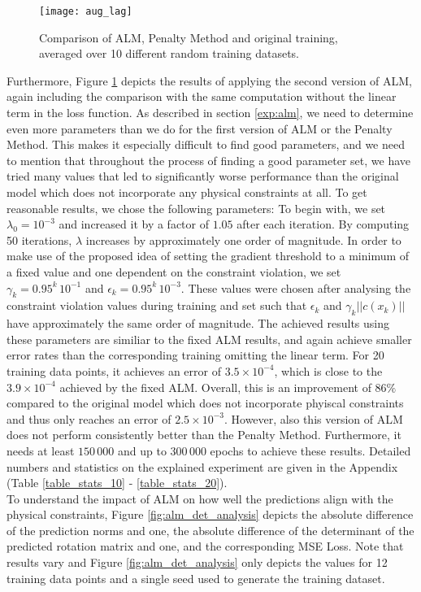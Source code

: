 \begin{figure}[H]
	\texttt{[image: aug\_lag]}
	\caption{Comparison of ALM, Penalty Method and original training, averaged over 10 different random training datasets.}
	\label{fig:aug_lag}
\end{figure}
Furthermore, Figure \ref{fig:aug_lag} depicts the results of applying the second version of ALM, again including the comparison with the same computation without the linear term in the loss function. As described in section \ref{exp:alm}, we need to determine even more parameters than we do for the first version of ALM or the Penalty Method. This makes it especially difficult to find good parameters, and we need to mention that throughout the process of finding a good parameter set, we have tried many values that led to significantly worse performance than the original model which does not incorporate any physical constraints at all. To get reasonable results, we chose the following parameters: To begin with, we set $\lambda_{0} = 10^{-3}$ and increased it by a factor of $1.05$ after each iteration. By computing 50 iterations, $\lambda$ increases by approximately one order of magnitude. In order to make use of the proposed idea of setting the gradient threshold to a minimum of a fixed value and one dependent on the constraint violation, we set $\gamma_k = 0.95^k\,10^{-1}$ and $\epsilon_k = 0.95^k\,10^{-3}$. These values were chosen after analysing the constraint violation values during training and set such that $\epsilon_k$ and $\gamma_k ||c(x_k)||$ have approximately the same order of magnitude. The achieved results using these parameters are similiar to the fixed ALM results, and again achieve smaller error rates than the corresponding training omitting the linear term. For 20 training data points, it achieves an error of $3.5\times 10^{-4}$, which is close to the $3.9 \times 10^{-4}$ achieved by the fixed ALM. Overall, this is an improvement of $86\%$ compared to the original model which does not incorporate phyiscal constraints and thus only reaches an error of $2.5\times 10^{-3}$. However, also this version of ALM does not perform consistently better than the Penalty Method. Furthermore, it needs at least $150\,000$ and up to $300\,000$ epochs to achieve these results. Detailed numbers and statistics on the explained experiment are given in the Appendix (Table \ref{table_stats_10} - \ref{table_stats_20}).\\
\indent To understand the impact of ALM on how well the predictions align with the physical constraints, Figure \ref{fig:alm_det_analysis} depicts the absolute difference of the prediction norms and one, the absolute difference of the determinant of the predicted rotation matrix and one, and the corresponding MSE Loss. Note that results vary and Figure \ref{fig:alm_det_analysis} only depicts the values for 12 training data points and a single seed used to generate the training dataset.

